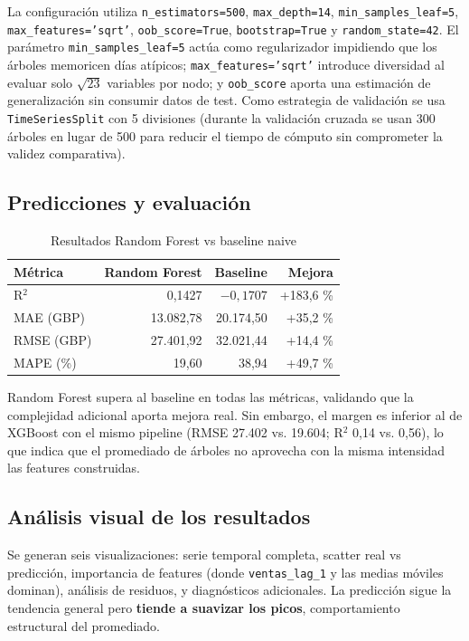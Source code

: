 \documentclass[11pt,a4paper]{article}
\begin{document}
La configuración utiliza \texttt{n\_estimators=500}, \texttt{max\_depth=14}, \texttt{min\_samples\_leaf=5}, \texttt{max\_features='sqrt'}, \texttt{oob\_score=True}, \texttt{bootstrap=True} y \texttt{random\_state=42}. El parámetro \texttt{min\_samples\_leaf=5} actúa como regularizador impidiendo que los árboles memoricen días atípicos; \texttt{max\_features='sqrt'} introduce diversidad al evaluar solo $\sqrt{23}$ variables por nodo; y \texttt{oob\_score} aporta una estimación de generalización sin consumir datos de test. Como estrategia de validación se usa \texttt{TimeSeriesSplit} con 5 divisiones (durante la validación cruzada se usan 300 árboles en lugar de 500 para reducir el tiempo de cómputo sin comprometer la validez comparativa).

\subsection{Predicciones y evaluación}

\begin{table}[h]
\centering
\caption{Resultados Random Forest vs baseline naive}
\begin{tabular}{lrrr}
\toprule
\textbf{Métrica} & \textbf{Random Forest} & \textbf{Baseline} & \textbf{Mejora} \\
\midrule
R$^2$ & 0,1427 & $-0,1707$ & +183,6 \% \\
MAE (GBP) & 13.082,78 & 20.174,50 & +35,2 \% \\
RMSE (GBP) & 27.401,92 & 32.021,44 & +14,4 \% \\
MAPE (\%) & 19,60 & 38,94 & +49,7 \% \\
\bottomrule
\end{tabular}
\end{table}

Random Forest supera al baseline en todas las métricas, validando que la complejidad adicional aporta mejora real. Sin embargo, el margen es inferior al de XGBoost con el mismo pipeline (RMSE 27.402 vs. 19.604; R$^2$ 0,14 vs. 0,56), lo que indica que el promediado de árboles no aprovecha con la misma intensidad las features construidas.

\subsection{Análisis visual de los resultados}

Se generan seis visualizaciones: serie temporal completa, scatter real vs predicción, importancia de features (donde \texttt{ventas\_lag\_1} y las medias móviles dominan), análisis de residuos, y diagnósticos adicionales. La predicción sigue la tendencia general pero \textbf{tiende a suavizar los picos}, comportamiento estructural del promediado.
\end{document}
